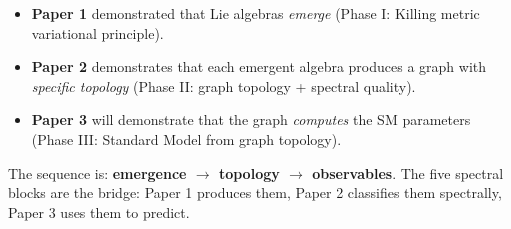 \begin{itemize}
    \item \textbf{Paper 1} demonstrated that Lie algebras \emph{emerge} (Phase I: Killing metric variational principle).
    \item \textbf{Paper 2} demonstrates that each emergent algebra produces a graph with \emph{specific topology} (Phase II: graph topology + spectral quality).
    \item \textbf{Paper 3} will demonstrate that the graph \emph{computes} the SM parameters (Phase III: Standard Model from graph topology).
\end{itemize}

The sequence is: \textbf{emergence $\to$ topology $\to$ observables}. The five spectral blocks are the bridge: Paper 1 produces them, Paper 2 classifies them spectrally, Paper 3 uses them to predict.
